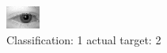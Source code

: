 \begin{figure}[h!]
\begin{center}
\includegraphics[width=0.60\columnwidth]{figures/ID440_class_1_target_2.png}
\end{center}
\caption{ Classification: 1 actual target: 2}
\label{fig:ID440_class_1_target_2}
\end{figure}

